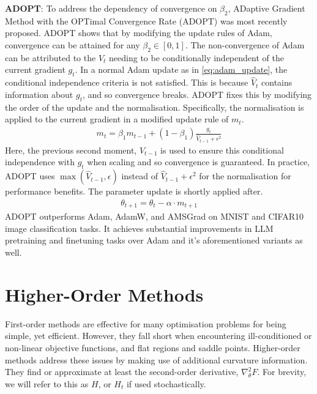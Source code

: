 \textbf{ADOPT}: To address the dependency of convergence on $\beta_2$, ADaptive Gradient Method with the OPTimal Convergence Rate (ADOPT) was most recently proposed. ADOPT shows that by modifying the update rules of Adam, convergence can be attained for any $\beta_2 \in [0, 1]$. The non-convergence of Adam can be attributed to the $V_t$ needing to be conditionally independent of the current gradient $g_t$. In a normal Adam update as in \cref{eq:adam_update}, the conditional independence criteria is not satisfied. This is because $\hat{V}_t$ contains information about $g_t$, and so convergence breaks. ADOPT fixes this by modifying the order of the update and the normalisation. Specifically, the normalisation is applied to the current gradient in a modified update rule of $m_t$.
\begin{align}
    m_t = \beta_1 m_{t-1} + (1 - \beta_1) \frac{g_t}{\hat{V}_{t-1} + \epsilon^2}
\end{align}
Here, the previous second moment, $V_{t-1}$ is used to ensure this conditional independence with $g_t$ when scaling and so convergence is guaranteed. In practice, ADOPT uses $\max(\hat{V}_{t-1}, \epsilon)$ instead of $\hat{V}_{t-1} + \epsilon^2$ for the normalisation for performance benefits. The parameter update is shortly applied after.
\begin{align}
    \theta_{t+1} = \theta_{t} - \alpha \cdot m_{t+1}
\end{align}
ADOPT outperforms Adam, AdamW, and AMSGrad on MNIST and CIFAR10 image classification tasks.
It achieves substantial improvements in LLM pretraining and finetuning tasks over Adam and it's aforementioned variants as well. 

\section{Higher-Order Methods}
First-order methods are effective for many optimisation problems for being simple, yet efficient. However, they fall short when encountering ill-conditioned or non-linear objective functions, and flat regions and saddle points. Higher-order methods address these issues by making use of additional curvature information. They find or approximate at least the second-order derivative, $\nabla_{\theta}^{2}F$. For brevity, we will refer to this as $H$, or $H_t$ if used stochastically. 

